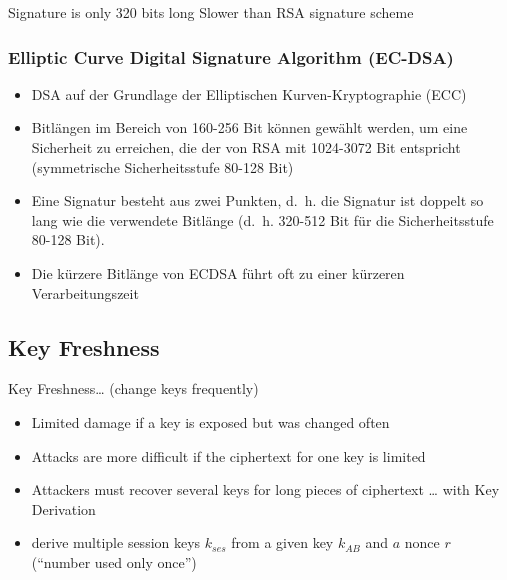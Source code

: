 \documentclass[
  10pt,
  a4paper,
]{article}
\providecommand{\tightlist}{%
  \setlength{\itemsep}{0pt}\setlength{\parskip}{0pt}}\usepackage{longtable,booktabs,array}
\begin{document}
\begin{multicols*}{2}
\begin{tcolorbox}
\begin{description}
\tightlist
\item[Based on Elgamal]
\faPlus Signature is only 320 bits long \textbar{} \faMinus Slower than
RSA signature scheme
\end{description}

\end{tcolorbox}

\subsubsection{Elliptic Curve Digital Signature Algorithm
(EC-DSA)}\label{elliptic-curve-digital-signature-algorithm-ec-dsa}

\begin{itemize}
\tightlist
\item
  DSA auf der Grundlage der Elliptischen Kurven-Kryptographie (ECC)
\item
  Bitlängen im Bereich von 160-256 Bit können gewählt werden, um eine
  Sicherheit zu erreichen, die der von RSA mit 1024-3072 Bit entspricht
  (symmetrische Sicherheitsstufe 80-128 Bit)
\item
  Eine Signatur besteht aus zwei Punkten, d.~h. die Signatur ist doppelt
  so lang wie die verwendete Bitlänge (d.~h. 320-512 Bit für die
  Sicherheitsstufe 80-128 Bit).
\item
  Die kürzere Bitlänge von ECDSA führt oft zu einer kürzeren
  Verarbeitungszeit
\end{itemize}

\subsection{Key Freshness}\label{key-freshness}

Key Freshness\ldots{} (change keys frequently)

\begin{itemize}
\tightlist
\item
  Limited damage if a key is exposed but was changed often
\item
  Attacks are more difficult if the ciphertext for one key is limited
\item
  Attackers must recover several keys for long pieces of ciphertext
  \ldots{} with Key Derivation
\item
  derive multiple session keys \(k_{ses}\) from a given key \(k_{AB}\)
  and \(a\) nonce \(r\) (``number used only once'')
\end{itemize}


\end{multicols*}
\end{document}
